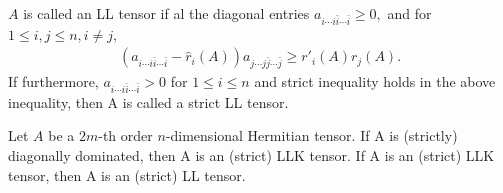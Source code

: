 \documentclass[10pt,a4paper]{amsart}
\begin{document}
\begin{defn}
$A$ is called an LL tensor if al the diagonal entries $a_{i\cdots i\bar{i}\cdots\bar{i}}\geq0,$ and for $1\leq i,j\leq n, i\neq j,$
	\begin{align} (a_{i\cdots i\bar{i}\cdots\bar{i}}-\hat{r}_{i}(A))a_{j\cdots j\bar{j}\cdots\bar{j}}\geq r'_{i}(A)r_{j}(A).\label{4.13} \end{align}
	If furthermore, $a_{i\cdots i\bar{i}\cdots\bar{i}}>0$ for $1\leq i\leq n$ and strict inequality holds in the above inequality, then A is called a strict LL tensor.
\end{defn}

\begin{prop}
Let $A$ be a $2m$-th order $n$-dimensional Hermitian tensor. If A is (strictly) diagonally dominated, then A is an (strict) LLK tensor. If A is an (strict) LLK tensor, then A is an (strict) LL tensor.
	\end{prop}
\end{document}
